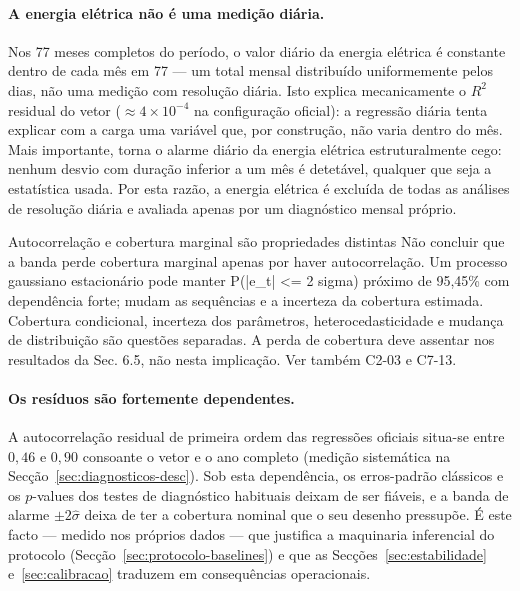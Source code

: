 \paragraph{A energia elétrica não é uma medição diária.} Nos 77 meses
completos do período, o valor diário da energia elétrica é constante dentro de
cada mês em 77 --- um total mensal distribuído uniformemente pelos dias, não
uma medição com resolução diária. Isto explica mecanicamente o $R^2$
residual do vetor ($\approx 4\times 10^{-4}$ na configuração oficial): a
regressão diária tenta explicar com a carga uma variável que, por construção,
não varia dentro do mês. Mais importante, torna o alarme diário da energia
elétrica estruturalmente cego: nenhum desvio com duração inferior a um mês é
detetável, qualquer que seja a estatística usada. Por esta razão, a energia
elétrica é excluída de todas as análises de resolução diária e avaliada
apenas por um diagnóstico mensal próprio.

{Autocorrelação e cobertura marginal são propriedades distintas}
{Não concluir que a banda perde cobertura marginal apenas por haver
autocorrelação. Um processo gaussiano estacionário pode manter
P(|e\_t| \textless{}= 2 sigma) próximo de 95,45\% com dependência forte; mudam as
sequências e a incerteza da cobertura estimada. Cobertura condicional,
incerteza dos parâmetros, heterocedasticidade e mudança de distribuição
são questões separadas. A perda de cobertura deve assentar nos resultados
da Sec. 6.5, não nesta implicação. Ver também C2-03 e C7-13.}%
\paragraph{Os resíduos são fortemente dependentes.} A autocorrelação residual
de primeira ordem das regressões oficiais situa-se entre $0{,}46$ e $0{,}90$
consoante o vetor e o ano completo (medição sistemática na
Secção~\ref{sec:diagnosticos-desc}). Sob esta dependência, os erros-padrão clássicos e
os $p$-values dos testes de diagnóstico habituais deixam de ser fiáveis, e a
banda de alarme $\pm 2\hat\sigma$ deixa de ter a cobertura nominal que o seu
desenho pressupõe. É este facto --- medido nos próprios dados --- que
justifica a maquinaria inferencial do protocolo
(Secção~\ref{sec:protocolo-baselines}) e que as Secções~\ref{sec:estabilidade}
e~\ref{sec:calibracao} traduzem em consequências operacionais.

